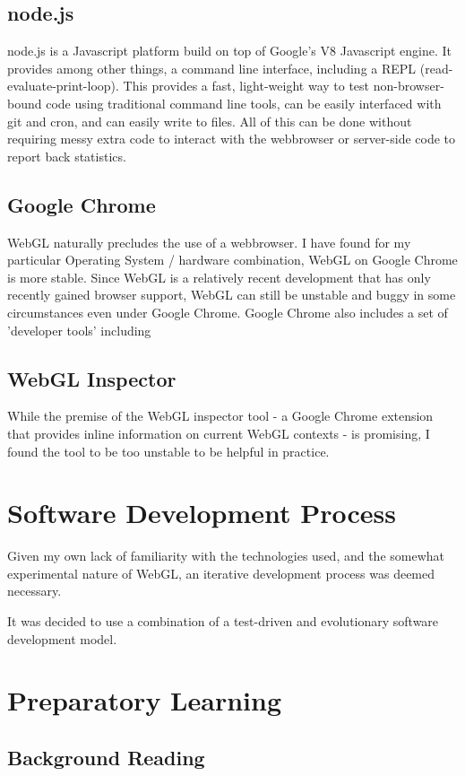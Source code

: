 \documentclass[12pt,twoside,notitlepage]{report}
\begin{document}
\subsection{node.js}
node.js is a Javascript platform build on top of Google's V8 Javascript engine. It provides among other things, a command line interface, including a REPL (read-evaluate-print-loop). This provides a fast, light-weight way to test non-browser-bound code using traditional command line tools, can be easily interfaced with git and cron, and can easily write to files. All of this can be done without requiring messy extra code to interact with the webbrowser or server-side code to report back statistics.

\subsection{Google Chrome}
WebGL naturally precludes the use of a webbrowser. I have found for my particular Operating System / hardware combination, WebGL on Google Chrome is more stable. Since WebGL is a relatively recent development that has only recently gained browser support, WebGL can still be unstable and buggy in some circumstances even under Google Chrome. Google Chrome also includes a set of 'developer tools' including 

\subsection{WebGL Inspector}
While the premise of the WebGL inspector tool - a Google Chrome extension that provides inline information on current WebGL contexts - is promising, I found the tool to be too unstable to be helpful in practice.

\section{Software Development Process}
Given my own lack of familiarity with the technologies used, and the somewhat experimental nature of WebGL, an iterative development process was deemed necessary.

It was decided to use a combination of a test-driven and evolutionary software development model.

\section{Preparatory Learning}
\subsection{Background Reading}
\end{document}

